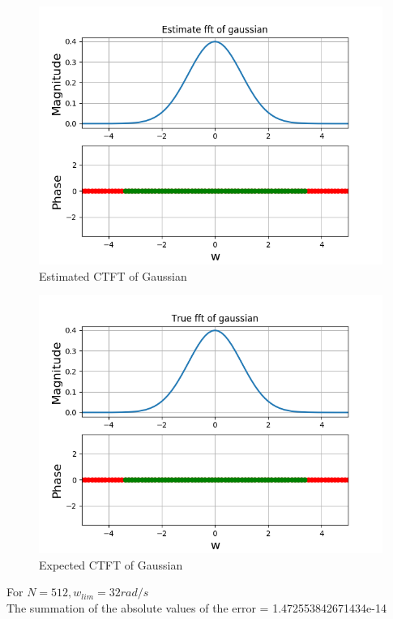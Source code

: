\documentclass{article}
\begin{document}
\begin{figure}[h!]
\centering
\includegraphics[scale=0.6]{gaussest.png}
\caption{Estimated CTFT of Gaussian}
\label{fig:universe}
\end{figure}

\begin{figure}[h!]
\centering
\includegraphics[scale=0.6]{gaussreal.png}
\caption{Expected CTFT of Gaussian}
\label{fig:universe}
\end{figure}
For $N=512, w_{lim}=32 rad/s$ \\
The summation of the absolute values of the error = 1.472553842671434e-14\newline


\clearpage
\end{document}
